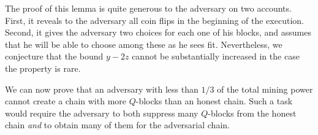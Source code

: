 

The proof of this lemma is quite generous to the adversary on two
accounts. First, it reveals to the adversary all coin flips in the beginning
of the execution. Second, it gives the adversary two choices for each one of
his blocks, and assumes that he will be able to choose among these as he sees
fit. Nevertheless, we conjecture that the bound $y-2z$ cannot be substantially
increased in the case the property is rare.


%

We can now prove that an adversary with less than $1/3$ of the total mining power
cannot create a chain with more $Q$-blocks than an honest chain. Such a task
would require the adversary to both suppress many $Q$-blocks from the honest
chain \emph{and} to obtain many of them for the adversarial chain.

